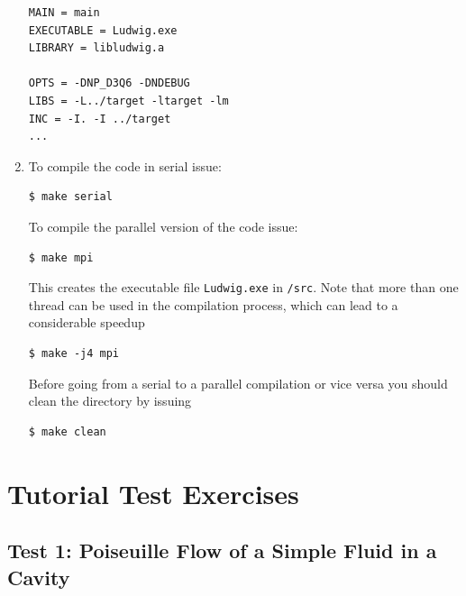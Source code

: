 \documentclass[11pt,twoside,a4paper]{article}
\begin{document}
\begin{enumerate}
\begin{lstlisting}
MAIN = main
EXECUTABLE = Ludwig.exe
LIBRARY = libludwig.a

OPTS = -DNP_D3Q6 -DNDEBUG
LIBS = -L../target -ltarget -lm
INC = -I. -I ../target
...
\end{lstlisting}
\item To compile the code in serial issue: \\
\begin{lstlisting}
$ make serial
\end{lstlisting} 
To compile the parallel version of the code issue: \\
\begin{lstlisting}
$ make mpi
\end{lstlisting} 
This creates the executable file \texttt{Ludwig.exe} in \texttt{/src}. 
Note that more than one thread can be used in the compilation process,
which can lead to a considerable speedup  
\begin{lstlisting}
$ make -j4 mpi
\end{lstlisting} 
Before going from a serial to a parallel compilation or vice versa
you should clean the directory by issuing
\begin{lstlisting}
$ make clean
\end{lstlisting}

\end{enumerate}

\section{Tutorial Test Exercises}

\subsection{Test 1: Poiseuille Flow of a Simple Fluid in a Cavity}
\end{document}
